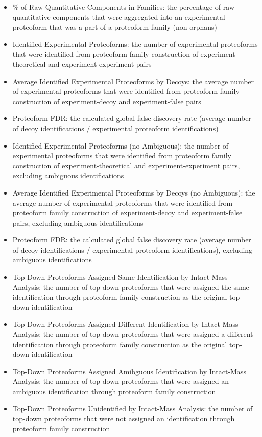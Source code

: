 \begin{itemize}
\begin{itemize}
\item \% of Raw Quantitative Components in Families:  the percentage of raw quantitative components that were aggregated into an experimental proteoform that was a part of a proteoform family (non-orphans)
\item Identified Experimental Proteoforms: the number of experimental proteoforms that were identified from proteoform family construction of experiment-theoretical and experiment-experiment pairs
\item Average Identified Experimental Proteoforms by Decoys: the average number of experimental proteoforms that were identified from proteoform family construction of experiment-decoy and experiment-false pairs
\item Proteoform FDR: the calculated global false discovery rate (average number of decoy identifications / experimental proteoform identifications)
\item Identified Experimental Proteoforms (no Ambiguous): the number of experimental proteoforms that were identified from proteoform family construction of experiment-theoretical and experiment-experiment pairs, excluding ambiguous identifications
\item Average Identified Experimental Proteoforms by Decoys (no Ambiguous): the average number of experimental proteoforms that were identified from proteoform family construction of experiment-decoy and experiment-false pairs, excluding ambiguous identifications
\item Proteoform FDR:  the calculated global false discovery rate (average number of decoy identifications / experimental proteoform identifications), excluding ambiguous identifications
\item Top-Down Proteoforms Assigned Same Identification by Intact-Mass Analysis: the number of top-down proteoforms that were assigned the same identification through proteoform family construction as the original top-down identification
\item Top-Down Proteoforms Assigned Different Identification by Intact-Mass Analysis: the number of top-down proteoforms that were assigned a different identification through proteoform family construction as the original top-down identification
\item Top-Down Proteoforms Assigned Amibguous Identification by Intact-Mass Analysis: the number of top-down proteoforms that were assigned an ambiguous identification through proteoform family construction
\item Top-Down Proteoforms Unidentified by Intact-Mass Analysis: the number of top-down proteoforms that were not assigned an identification through proteoform family construction

\end{itemize}
\end{itemize}
